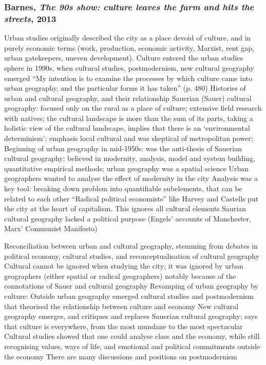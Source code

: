 \documentclass{article}
\begin{document}
\subsubsection{Barnes, \textit{The 90s show: culture leaves the farm and hits the streets}, 2013}

\begin{outline}
	\1 Urban studies originally described the city as a place devoid of culture, and in purely economic terms (work, production, economic activity, Marxist, rent gap, urban gatekeepers, uneven development). Culture entered the urban studies sphere in 1990s, when cultural studies, postmodernism, new cultural geography emerged
	\1 ``My intention is to examine the processes by which culture came into urban geography, and the particular forms it has taken'' (p. 480)
	\1 Histories of urban and cultural geography, and their relationship
		\2 Sauerian (Sauer) cultural geography: focused only on the rural as a place of culture; extensive field research with natives; the cultural landscape is more than the sum of its parts, taking a holistic view of the cultural landscape, implies that there is an `environmental determinism'; emphasis local cultural and was skeptical of metropolitan power;
		\2 Beginning of urban geography in mid-1950s: was the anti-thesis of Sauerian cultural geography; believed in modernity, analysis, model and system building, quantitative empirical methods; urban geography was a spatial science
			\3 Urban geographers wanted to analyse the effect of modernity in the city
			\3 Analysis was a key tool: breaking down problem into quantifiable subelements, that can be related to each other
			\3 ``Radical political economists'' like Harvey and Castells put the city at the heart of capitalism. This ignores all cultural elements
			\3 Saurian cultural geography lacked a political purpose (Engels' accounts of Manchester, Marx' Communist Manifesto)
	
	\1 Reconciliation between urban and cultural geography, stemming from debates in political economy, cultural studies, and reconceptualisation of cultural geography
		\2 Cultural cannot be ignored when studying the city; it was ignored by urban geographers (either spatial or radical geographers) notably because of the connotations of Sauer and cultural geography
		\2 Revamping of urban geography by culture:
			\3 Outside urban geography emerged cultural studies and postmodernism that theorised the relationship between culture and economy
			\3 New cultural geography emerges, and critiques and replaces Sauerian cultural geography; says that culture is everywhere, from the most mundane to the most spectacular
		\2 Cultural studies showed that one could analyse class and the economy, while still recognising values, ways of life, and emotional and political commitments outside the economy
		\2 There are many discussions and positions on postmodernism
		

\end{outline}
\end{document}
